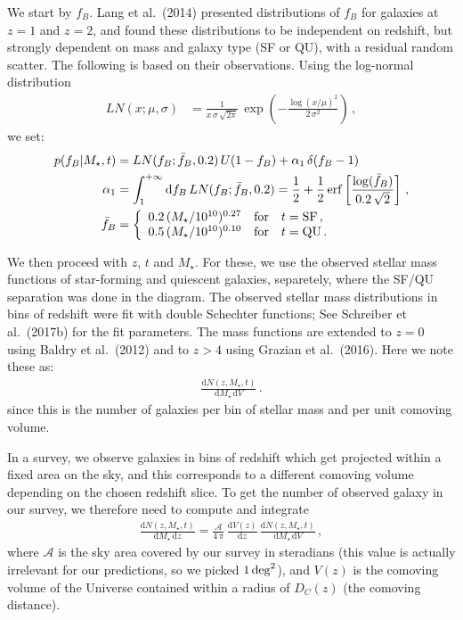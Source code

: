 \documentclass[11pt,a4paper]{article}
\newcommand{\mstar}{M_\star}
\newcommand{\uvj}{\text{\it UVJ}\xspace}
\newcommand{\dd}{\mathrm{d}}
\numberwithin{equation}{section}
\begin{document}
We start by $f_B$. Lang et al.~(2014) presented distributions of $f_B$ for galaxies at $z=1$ and $z=2$, and found these distributions to be independent on redshift, but strongly dependent on mass and galaxy type (SF or QU), with a residual random scatter. The following is based on their observations. Using the log-normal distribution
\begin{align}
LN(x; \mu, \sigma) &= \frac{1}{x\,\sigma\,\sqrt{2\pi}}\,\exp\left(-\frac{\log(x/\mu)^2}{2\,\sigma^2}\right)\,,
\end{align}
we set:
\begin{align}
p(f_B | \mstar, t) &= LN(f_B; \bar{f}_B, 0.2)\,U(1 - f_B) + \alpha_1\,\delta(f_B - 1)  \\
\alpha_1 &= \int_1^{+\infty}\dd f_B\, LN(f_B; \bar{f}_B, 0.2)
= \frac{1}{2} + \frac{1}{2}\,{\rm erf}\left[\frac{\log(\bar{f}_B)}{0.2\,\sqrt{2}}\right]\,, \\
\bar{f}_B &= \left\{\begin{array}{lll}
0.2\,(\mstar/10^{10})^{0.27} & \text{for} & t={\rm SF}\,, \\
0.5\,(\mstar/10^{10})^{0.10} & \text{for} & t={\rm QU}\,.
\end{array}\right.
\end{align}

We then proceed with $z$, $t$ and $\mstar$. For these, we use the observed stellar mass functions of star-forming and quiescent galaxies, separetely, where the SF/QU separation was done in the \uvj diagram. The observed stellar mass distributions in bins of redshift were fit with double Schechter functions; See Schreiber et al.~(2017b) for the fit parameters. The mass functions are extended to $z=0$ using Baldry et al.~(2012) and to $z>4$ using Grazian et al.~(2016). Here we note these as:
\begin{align}
\frac{\dd N(z, \mstar, t)}{\dd \mstar\,\dd V}\,.
\end{align}
since this is the number of galaxies per bin of stellar mass and per unit comoving volume.

In a survey, we observe galaxies in bins of redshift which get projected within a fixed area on the sky, and this corresponds to a different comoving volume depending on the chosen redshift slice. To get the number of observed galaxy in our survey, we therefore need to compute and integrate
\begin{align}
\frac{\dd N(z, \mstar, t)}{\dd \mstar\,\dd z} = \frac{\mathcal{A}}{4\,\pi}\,\frac{\dd V(z)}{\dd z}\,\frac{\dd N(z, \mstar, t)}{\dd \mstar\,\dd V}\,,
\end{align}
where $\mathcal{A}$ is the sky area covered by our survey in steradians (this value is actually irrelevant for our predictions, so we picked $1\,{\rm deg}^2$), and $V(z)$ is the comoving volume of the Universe contained within a radius of $D_C(z)$ (the comoving distance).
\end{document}

